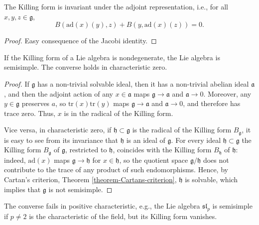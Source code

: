 \begin{lemma}
\label{lemma-Killing-invariant}
The Killing form is invariant under the adjoint representation, i.e., for all $x, y, z\in \mathfrak g$,
$$ B(\text{ad}(x)(y), z) + B(y, \text{ad}(x)(z)) = 0.$$
\end{lemma}

\begin{proof}
 Easy consequence of the Jacobi identity.
\end{proof}


\begin{theorem}
 \label{theorem-Killing-semisimplicity}
If the Killing form of a Lie algebra is nondegenerate, the Lie algebra is semisimple. The converse holds in characteristic zero.
\end{theorem}

\begin{proof}
 If $\mathfrak g$ has a non-trivial solvable ideal, then it has a non-trivial abelian ideal $\mathfrak a$, and then the adjoint action of any $x\in \mathfrak a$ maps $\mathfrak g\to\mathfrak a$ and $\mathfrak a\to 0$. Moreover, any $y\in \mathfrak g$ preserves $a$, so 
 $\text{tr}(x) \text{tr}(y)$ maps $\mathfrak g\to\mathfrak a$ and $\mathfrak a\to 0$, and therefore has trace zero. Thus, $x$ is in the radical of the Killing form.
 
 Vice versa, in characteristic zero, if $\mathfrak h\subset \mathfrak g$ is the radical of the Killing form $B_{\mathfrak g}$, it is easy to see from its invariance that $\mathfrak h$ is an ideal of $\mathfrak g$. For every ideal $\mathfrak h\subset \mathfrak g$ the Killing form $B_{\mathfrak g}$ of $\mathfrak g$, restricted to $\mathfrak h$, coincides with the Killing form $B_{\mathfrak h}$ of $\mathfrak h$: indeed, $\text{ad}(x)$ maps $\mathfrak g\to \mathfrak h$ for $x\in \mathfrak h$, so the quotient space $\mathfrak g/\mathfrak h$ does not contribute to the trace of any product of such endomorphisms. Hence, by Cartan's criterion, Theorem \ref{theorem-Cartans-criterion}, $\mathfrak h$ is solvable, which implies that $\mathfrak g$ is not semisimple.
\end{proof}

\begin{remark}
 \label{remark-Killing-positivechar}
 The converse fails in positive characteristic, e.g., the Lie algebra $\mathfrak{sl}_p$ is semisimple if $p\ne 2$ is the characteristic of the field, but its Killing form vanishes.
\end{remark}



